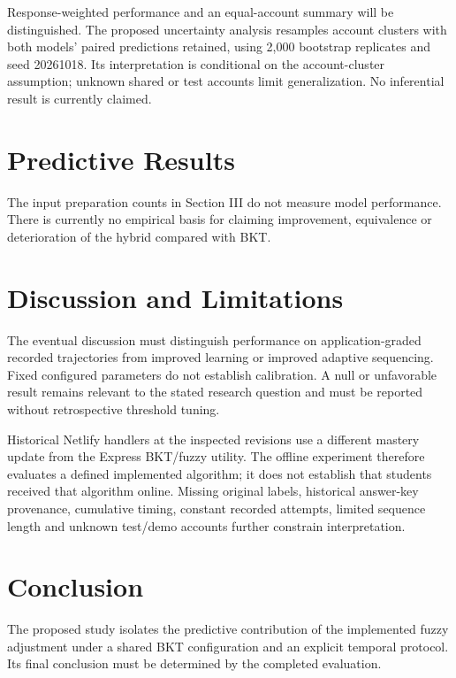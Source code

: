 \documentclass[conference]{IEEEtran}
\newif\ifworkingdraft
\newcommand{\draftnote}[1]{\ifworkingdraft\par\noindent\textcolor{red}{\textbf{Author review:} #1}\par\fi}
\begin{document}
Response-weighted performance and an equal-account summary will be distinguished. The proposed uncertainty analysis resamples account clusters with both models' paired predictions retained, using 2,000 bootstrap replicates and seed 20261018. Its interpretation is conditional on the account-cluster assumption; unknown shared or test accounts limit generalization. No inferential result is currently claimed.

\section{Predictive Results}
\draftnote{Not yet evaluated. Insert actual results only after protocol approval, source-fidelity checks and execution. Required outputs are scored target/class counts, paired Brier difference and uncertainty interval, both models' log loss and AUROC, and the equal-account summary. No placeholder numeric scores should be added.}
The input preparation counts in Section III do not measure model performance. There is currently no empirical basis for claiming improvement, equivalence or deterioration of the hybrid compared with BKT.

\section{Discussion and Limitations}
\draftnote{Complete interpretation after observing the actual paired results. Do not assume the direction of the effect.}
The eventual discussion must distinguish performance on application-graded recorded trajectories from improved learning or improved adaptive sequencing. Fixed configured parameters do not establish calibration. A null or unfavorable result remains relevant to the stated research question and must be reported without retrospective threshold tuning.

Historical Netlify handlers at the inspected revisions use a different mastery update from the Express BKT/fuzzy utility. The offline experiment therefore evaluates a defined implemented algorithm; it does not establish that students received that algorithm online. Missing original labels, historical answer-key provenance, cumulative timing, constant recorded attempts, limited sequence length and unknown test/demo accounts further constrain interpretation.

\section{Conclusion}
\draftnote{The conclusion remains pending. State whether the implemented adjustment improved the prespecified predictive measures only after the actual comparison. Do not infer learning gains or general superiority from an offline result.}
The proposed study isolates the predictive contribution of the implemented fuzzy adjustment under a shared BKT configuration and an explicit temporal protocol. Its final conclusion must be determined by the completed evaluation.
\end{document}
